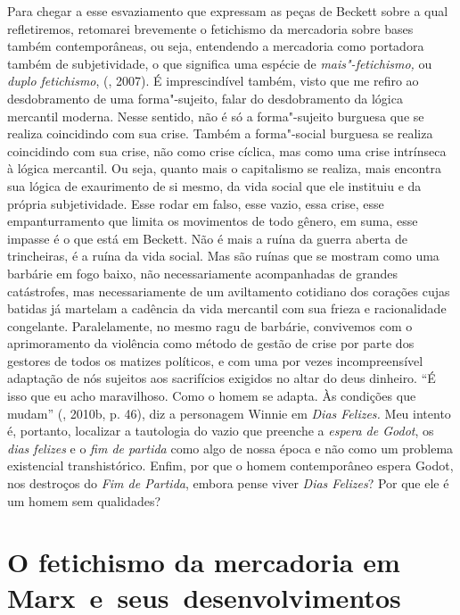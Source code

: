 Para chegar a esse esvaziamento que expressam as peças de Beckett sobre
a qual refletiremos, retomarei brevemente o fetichismo da mercadoria sobre bases
também contemporâneas, ou seja, entendendo a mercadoria como portadora
também de subjetividade, o que significa uma espécie de
\emph{mais"-fetichismo,} ou \emph{duplo fetichismo}, (,
2007). É imprescindível também, visto que me refiro ao
desdobramento de uma forma"-sujeito, falar do desdobramento da lógica
mercantil moderna. Nesse sentido, não é só a forma"-sujeito burguesa que
se realiza coincidindo com sua crise. Também a forma"-social burguesa se
realiza coincidindo com sua crise, não como crise cíclica, mas como uma
crise intrínseca à lógica mercantil. Ou seja, quanto mais o capitalismo
se realiza, mais encontra sua lógica de exaurimento de si mesmo, da vida
social que ele instituiu e da própria subjetividade. Esse rodar em
falso, esse vazio, essa crise, esse empanturramento que limita os
movimentos de todo gênero, em suma, esse impasse é o que está em
Beckett. Não é mais a ruína da guerra aberta de trincheiras, é a ruína da vida social.
Mas são ruínas que se mostram como uma barbárie em fogo baixo, não
necessariamente acompanhadas de grandes catástrofes, mas necessariamente
de um aviltamento cotidiano dos corações cujas batidas já martelam a
cadência da vida mercantil com sua frieza e racionalidade congelante.
Paralelamente, no mesmo ragu de barbárie, convivemos com o
aprimoramento da violência como método de gestão de crise por parte
dos gestores de todos os matizes políticos, e com uma por vezes
incompreensível adaptação de nós sujeitos aos sacrifícios exigidos no
altar do deus dinheiro. ``É isso que eu acho maravilhoso.
Como o homem se adapta. Às condições que mudam'' (, 2010b, p.
46), diz a personagem Winnie em \emph{Dias Felizes.} Meu intento é,
portanto, localizar a tautologia do vazio que preenche a \emph{espera de
Godot}, os \emph{dias felizes} e o \emph{fim de partida} como algo de
nossa época e não como um problema existencial transhistórico. Enfim,
por que o homem contemporâneo espera Godot, nos destroços do \emph{Fim
de Partida}, embora pense viver \emph{Dias Felizes}? Por que ele é um
homem sem qualidades?

\section*{O fetichismo da mercadoria em Marx~e~seus~desenvolvimentos}

